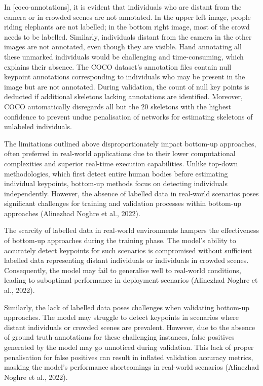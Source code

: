 
In [coco-annotations], it is evident that individuals who are distant from the camera or in crowded scenes are not annotated. In the upper left image, people riding elephants are not labelled; in the bottom right image, most of the crowd needs to be labelled. Similarly, individuals distant from the camera in the other images are not annotated, even though they are visible. Hand annotating all these unmarked individuals would be challenging and time-consuming, which explains their absence. The COCO dataset's annotation files contain null keypoint annotations corresponding to individuals who may be present in the image but are not annotated. During validation, the count of null key points is deducted if additional skeletons lacking annotations are identified. Moreover, COCO automatically disregards all but the 20 skeletons with the highest confidence to prevent undue penalisation of networks for estimating skeletons of unlabeled individuals.

The limitations outlined above disproportionately impact bottom-up approaches, often preferred in real-world applications due to their lower computational complexities and superior real-time execution capabilities. Unlike top-down methodologies, which first detect entire human bodies before estimating individual keypoints, bottom-up methods focus on detecting individuals independently. However, the absence of labelled data in real-world scenarios poses significant challenges for training and validation processes within bottom-up approaches (\scc Alinezhad Noghre et al., 2022).

The scarcity of labelled data in real-world environments hampers the effectiveness of bottom-up approaches during the training phase. The model's ability to accurately detect keypoints for such scenarios is compromised without sufficient labelled data representing distant individuals or individuals in crowded scenes. Consequently, the model may fail to generalise well to real-world conditions, leading to suboptimal performance in deployment scenarios (\scc Alinezhad Noghre et al., 2022).

Similarly, the lack of labelled data poses challenges when validating bottom-up approaches. The model may struggle to detect keypoints in scenarios where distant individuals or crowded scenes are prevalent. However, due to the absence of ground truth annotations for these challenging instances, false positives generated by the model may go unnoticed during validation. This lack of proper penalisation for false positives can result in inflated validation accuracy metrics, masking the model's performance shortcomings in real-world scenarios (\scc Alinezhad Noghre et al., 2022).

